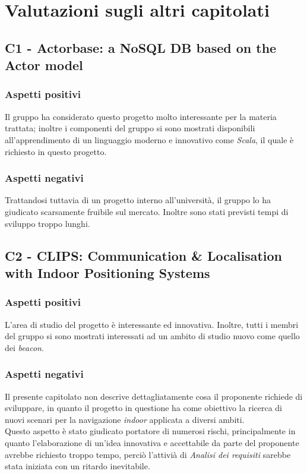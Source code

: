 \section{Valutazioni sugli altri capitolati}

\subsection{C1 - Actorbase: a NoSQL DB based on the Actor model}
\subsubsection{Aspetti positivi}
Il gruppo ha considerato questo progetto molto interessante per la materia trattata; inoltre
i componenti del gruppo si sono mostrati disponibili all'apprendimento di un linguaggio 
moderno e innovativo come \textit{Scala}, il quale \`e richiesto in questo progetto.
\subsubsection{Aspetti negativi}
Trattandosi tuttavia di un progetto interno all'universit\`a, il gruppo lo ha giudicato scarsamente
fruibile sul mercato. Inoltre sono stati previsti tempi di sviluppo troppo lunghi.


\subsection{C2 - CLIPS: Communication \& Localisation with Indoor Positioning Systems}
\subsubsection{Aspetti positivi}
L'area di studio del progetto è interessante ed innovativa. Inoltre, tutti i membri
del gruppo si sono mostrati interessati ad un ambito di studio nuovo come quello dei \textit{beacon}.
\subsubsection{Aspetti negativi}
Il presente capitolato non descrive dettagliatamente cosa il proponente richiede di sviluppare,
in quanto il progetto in questione ha come obiettivo la ricerca di nuovi scenari per la navigazione \textit{indoor}
applicata a diversi ambiti.\\
Questo aspetto \`e stato giudicato portatore di numerosi rischi, principalmente
in quanto l'elaborazione di un'idea innovativa e accettabile da parte del proponente avrebbe richiesto troppo tempo,
perci\`o l'attivi\`a di \textit{Analisi dei requisiti} sarebbe stata iniziata con un ritardo inevitabile. 


